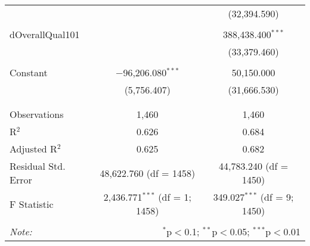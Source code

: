\documentclass{article}
\begin{document}
\begin{table}[t]
\begin{tabular}{@{\extracolsep{5pt}}lcc}
  &  & (32,394.590) \\ 
  & & \\ 
 dOverallQual101 &  & 388,438.400$^{***}$ \\ 
  &  & (33,379.460) \\ 
  & & \\ 
 Constant & $-$96,206.080$^{***}$ & 50,150.000 \\ 
  & (5,756.407) & (31,666.530) \\ 
  & & \\ 
\hline \\[-1.8ex] 
Observations & 1,460 & 1,460 \\ 
R$^{2}$ & 0.626 & 0.684 \\ 
Adjusted R$^{2}$ & 0.625 & 0.682 \\ 
Residual Std. Error & 48,622.760 (df = 1458) & 44,783.240 (df = 1450) \\ 
F Statistic & 2,436.771$^{***}$ (df = 1; 1458) & 349.027$^{***}$ (df = 9; 1450) \\ 
\hline 
\hline \\[-1.8ex] 
\textit{Note:}  & \multicolumn{2}{r}{$^{*}$p$<$0.1; $^{**}$p$<$0.05; $^{***}$p$<$0.01} \\ 
\end{tabular} 
\end{table}
\end{document}
